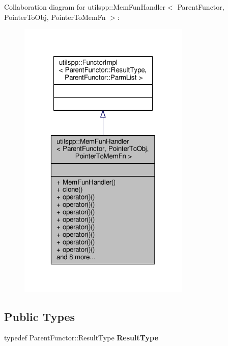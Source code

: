 Collaboration diagram for utilspp\-:\-:Mem\-Fun\-Handler$<$ Parent\-Functor, Pointer\-To\-Obj, Pointer\-To\-Mem\-Fn $>$\-:\nopagebreak
\begin{figure}[H]
\begin{center}
\leavevmode
\includegraphics[width=232pt]{classutilspp_1_1MemFunHandler__coll__graph}
\end{center}
\end{figure}
\subsection*{Public Types}
\begin{DoxyCompactItemize}
\item 
\hypertarget{classutilspp_1_1MemFunHandler_a0d25808d7d9945c438e1e532e7569921}{typedef Parent\-Functor\-::\-Result\-Type {\bfseries Result\-Type}}\label{classutilspp_1_1MemFunHandler_a0d25808d7d9945c438e1e532e7569921}

\end{DoxyCompactItemize}
